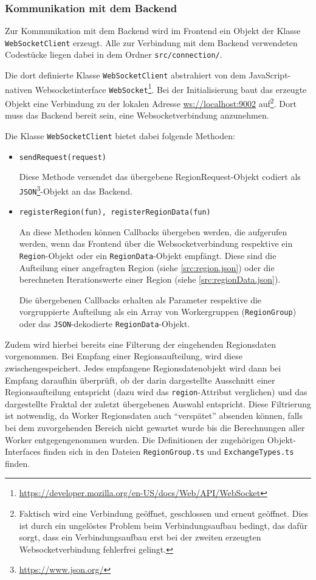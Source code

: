 \subsubsection{Kommunikation mit dem Backend}\label{sec:fontend_communication}
Zur Kommunikation mit dem Backend wird im Frontend ein Objekt der Klasse \verb|WebSocketClient| erzeugt.
Alle zur Verbindung mit dem Backend verwendeten Codestücke liegen dabei in dem Ordner \verb|src/connection/|.

Die dort definierte Klasse \verb|WebSocketClient| abstrahiert von dem JavaScript-nativen Websocketinterface \verb|WebSocket|\footnote{\url{https://developer.mozilla.org/en-US/docs/Web/API/WebSocket}}.
Bei der Initialisierung baut das erzeugte Objekt eine Verbindung zu der lokalen Adresse \url{ws://localhost:9002} auf\footnote{
	Faktisch wird eine Verbindung geöffnet, geschlossen und erneut geöffnet.
	Dies ist durch ein ungelöstes Problem beim Verbindungsaufbau bedingt, das dafür sorgt, dass ein Verbindungsaufbau
	erst bei der zweiten erzeugten Websocketverbindung fehlerfrei gelingt.
}.
Dort muss das Backend bereit sein, eine Websocketverbindung anzunehmen.

Die Klasse \verb|WebSocketClient| bietet dabei folgende Methoden:
\begin{itemize}
	\item \verb|sendRequest(request)|

	      Diese Methode versendet das übergebene RegionRequest-Objekt codiert als \verb|JSON|\footnote{\url{https://www.json.org/}}-Objekt an das Backend.
	\item \verb|registerRegion(fun), registerRegionData(fun)|

	      An diese Methoden können Callbacks übergeben werden, die aufgerufen werden, wenn das Frontend über die Websocketverbindung
	      respektive ein \texttt{Region}-Objekt oder ein \texttt{RegionData}-Objekt empfängt.
	      Diese sind die Aufteilung einer angefragten Region (siehe \autoref{src:region.json})
	      oder die berechneten Iterationswerte einer Region (siehe \autoref{src:regionData.json}).

	      Die übergebenen Callbacks erhalten als Parameter respektive die vorgruppierte Aufteilung als ein Array von Workergruppen (\texttt{RegionGroup})
	      oder das \verb|JSON|-dekodierte \verb|RegionData|-Objekt.
\end{itemize}
Zudem wird hierbei bereits eine Filterung der eingehenden Regionsdaten vorgenommen.
Bei Empfang einer Regionsaufteilung, wird diese zwischengespeichert.
Jedes empfangene Regionsdatenobjekt wird dann bei Empfang daraufhin überprüft,
ob der darin dargestellte Ausschnitt einer Regionsaufteilung entspricht (dazu wird das \verb|region|-Attribut verglichen)
und das dargestellte Fraktal der zuletzt übergebenen Auswahl entspricht.
Diese Filtrierung ist notwendig, da Worker Regionsdaten auch \enquote{verspätet} absenden können,
falls bei dem zuvorgehenden Bereich nicht gewartet wurde bis die Berechnungen aller Worker entgegengenommen wurden.
Die Definitionen der zugehörigen Objekt-Interfaces finden sich in den Dateien \verb|RegionGroup.ts| und \verb|ExchangeTypes.ts| finden.

